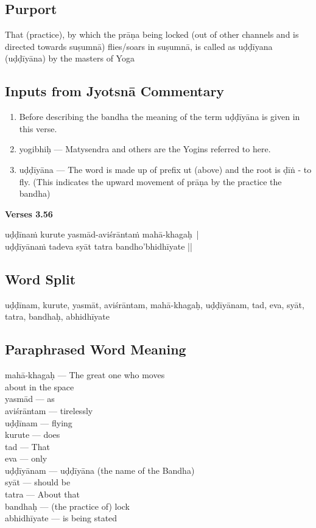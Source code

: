 \subsection*{Purport}

That (practice), by which the prāṇa being locked (out of other channels and is directed towards suṣumnā) flies/soars in suṣumnā, is called as uḍḍīyana (uḍḍīyāna) by the masters of Yoga

\subsection*{Inputs from Jyotsnā Commentary}

\begin{enumerate}
\item Before describing the bandha the meaning of the term uḍḍīyāna is given in this verse. 
\item yogibhiḥ --- Matysendra and others are the Yogins referred to here. 
\item uḍḍīyāna --- The word is made up of prefix ut (above) and the root is ḍīṅ - to fly. (This indicates the upward movement of prāṇa by the practice the bandha) 
\end{enumerate}


\noindent \textbf{Verses 3.56}

\begin{shloka}
uḍḍīnaṁ kurute yasmād-aviśrāntaṁ mahā-khagaḥ |\\
uḍḍīyānaṁ tadeva syāt tatra bandho'bhidhīyate ||
\end{shloka}

\subsection*{Word Split}

uḍḍīnam,  kurute, yasmāt, aviśrāntam, mahā-khagaḥ, uḍḍīyānam, tad, eva, syāt, tatra, bandhaḥ, abhidhīyate 

\subsection*{Paraphrased Word Meaning}

\begin{multicols}{2}
mahā-khagaḥ --- The great one who moves \\
about in the space  \\
yasmād --- as \\
aviśrāntam --- tirelessly \\
uḍḍīnam --- flying \\
kurute --- does \\
tad --- That \\
eva --- only\\
uḍḍīyānam --- uḍḍīyāna (the name of the Bandha)\\
syāt --- should be \\
tatra --- About that \\
bandhaḥ --- (the practice of) lock\\
abhidhīyate --- is being stated 
\end{multicols}

